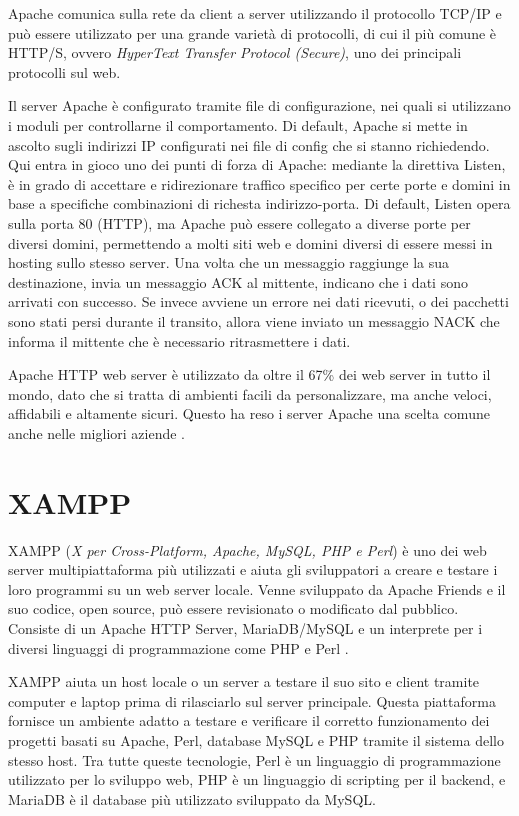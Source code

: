 Apache comunica sulla rete da client a server utilizzando il protocollo TCP/IP e può essere utilizzato per una grande varietà di protocolli, di cui il più comune è HTTP/S, ovvero \textit{HyperText Transfer Protocol (Secure)}, uno dei principali protocolli sul web.

Il server Apache è configurato tramite file di configurazione, nei quali si utilizzano i moduli per controllarne il comportamento. Di default, Apache si mette in ascolto sugli indirizzi IP configurati nei file di config che si stanno richiedendo. Qui entra in gioco uno dei punti di forza di Apache: mediante la direttiva Listen, è in grado di accettare e ridirezionare traffico specifico per certe porte e domini in base a specifiche combinazioni di richesta indirizzo-porta. Di default, Listen opera sulla porta 80 (HTTP), ma Apache può essere collegato a diverse porte per diversi domini, permettendo a molti siti web e domini diversi di essere messi in hosting sullo stesso server. 
Una volta che un messaggio raggiunge la sua destinazione, invia un messaggio ACK al mittente, indicano che i dati sono arrivati con successo. Se invece avviene un errore nei dati ricevuti, o dei pacchetti sono stati persi durante il transito, allora viene inviato un messaggio NACK che informa il mittente che è necessario ritrasmettere i dati.

Apache HTTP web server è utilizzato da oltre il 67\% dei web server in tutto il mondo, dato che si tratta di ambienti facili da personalizzare, ma anche veloci, affidabili e altamente sicuri. Questo ha reso i server Apache una scelta comune anche nelle migliori aziende \cite{Apache}.

\section{XAMPP}
XAMPP (\textit{X per Cross-Platform, Apache, MySQL, PHP e Perl}) è uno dei web server multipiattaforma più utilizzati e aiuta gli sviluppatori a creare e testare i loro programmi su un web server locale. Venne sviluppato da Apache Friends e il suo codice, open source, può essere revisionato o modificato dal pubblico. Consiste di un Apache HTTP Server, MariaDB/MySQL e un interprete per i diversi linguaggi di programmazione come PHP e Perl \cite{XAMPP, XAMPP_Docs}.

XAMPP aiuta un host locale o un server a testare il suo sito e client tramite computer e laptop prima di rilasciarlo sul server principale. Questa piattaforma fornisce un ambiente adatto a testare e verificare il corretto funzionamento dei progetti basati su Apache, Perl, database MySQL e PHP tramite il sistema dello stesso host. Tra tutte queste tecnologie, Perl è un linguaggio di programmazione utilizzato per lo sviluppo web, PHP è un linguaggio di scripting per il backend, e MariaDB è il database più utilizzato sviluppato da MySQL.

